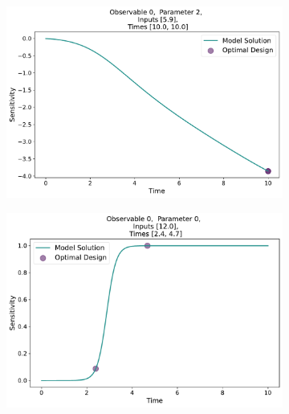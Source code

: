 \documentclass[10pt,A4paper]{article}
\begin{document}
\begin{figure}[H]
\begin{subfigure}{.5\textwidth}
      \subcaption{}
    \end{subfigure}
    \begin{subfigure}{.5\textwidth}
        \centering
        \includegraphics[scale=0.27]{Figures/Sensitivity_Results_baranyi_roberts_ode_fisher_determinant_rel_sensit_cont_2times_2temps_000_x_00_p_02.pdf}
        \subcaption{}
    \end{subfigure}
    \begin{subfigure}{.5\textwidth}
        \centering
        \includegraphics[scale=0.27]{Figures/Sensitivity_Results_baranyi_roberts_ode_fisher_determinant_rel_sensit_cont_2times_2temps_001_x_00_p_00.pdf}
        \subcaption{}
    \end{subfigure}

\end{figure}
\end{document}
